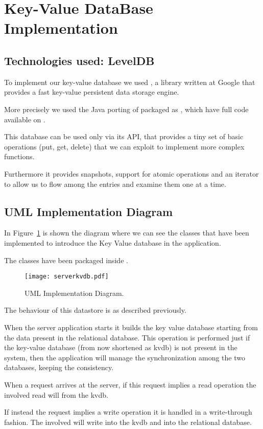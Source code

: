 \section{Key-Value DataBase Implementation}

\subsection{Technologies used: LevelDB}

To implement our key-value database we used , a library
written at Google that provides a fast key-value persistent data storage engine.

More precisely we used the Java porting of  packaged as
, which have full code available on .



This database can be used only via its API, that provides a tiny set of basic
operations (put, get, delete) that we can exploit to implement more complex
functions.

Furthermore it provides snapshots, support for atomic operations and
an iterator to allow us to flow among the entries and examine them one at a
time.

\subsection{UML Implementation Diagram}

In Figure~\ref{fig:serverkvdb} is shown the diagram where we can see the classes
that have been implemented to introduce the Key Value database in the
application.

The classes have been packaged inside .

\begin{landscape}
	\begin{figure}
		\texttt{[image: serverkvdb.pdf]}
		\caption{ UML Implementation Diagram.}
		\label{fig:serverkvdb}
	\end{figure}
\end{landscape}

The behaviour of this datastore is as described previously.

When the server application starts it builds the key value database starting
from the data present in the relational database. This operation is performed
just if the key-value database (from now shortened as kvdb) is not present in
the system, then the application will manage the synchronization among the two
databases, keeping the consistency.

When a request arrives at the server, if this request implies a read operation
the  involved read will from the kvdb.

If instead the request implies a write operation it is handled in a
write-through fashion. The  involved will write into the
kvdb and into the relational database.
